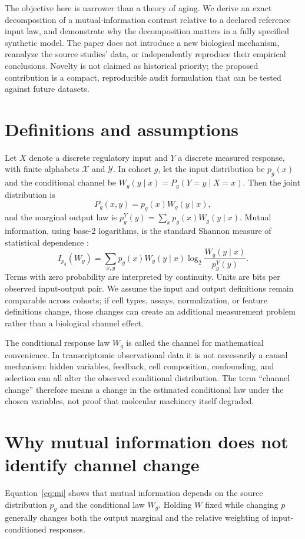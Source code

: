 \documentclass[11pt]{article}
\begin{document}
The objective here is narrower than a theory of aging. We derive an exact decomposition of a mutual-information contrast relative to a declared reference input law, and demonstrate why the decomposition matters in a fully specified synthetic model. The paper does not introduce a new biological mechanism, reanalyze the source studies' data, or independently reproduce their empirical conclusions. Novelty is not claimed as historical priority; the proposed contribution is a compact, reproducible audit formulation that can be tested against future datasets.

\section{Definitions and assumptions}
Let $X$ denote a discrete regulatory input and $Y$ a discrete measured response, with finite alphabets $\mathcal X$ and $\mathcal Y$. In cohort $g$, let the input distribution be $p_g(x)$ and the conditional channel be $W_g(y\mid x)=P_g(Y=y\mid X=x)$. Then the joint distribution is
\begin{equation}
P_g(x,y)=p_g(x)W_g(y\mid x),
\label{eq:joint}
\end{equation}
and the marginal output law is $p_g^Y(y)=\sum_x p_g(x)W_g(y\mid x)$. Mutual information, using base-2 logarithms, is the standard Shannon measure of statistical dependence \cite{cover2006}:
\begin{equation}
I_{p_g}(W_g)=\sum_{x,y}p_g(x)W_g(y\mid x)\log_2\frac{W_g(y\mid x)}{p_g^Y(y)}.
\label{eq:mi}
\end{equation}
Terms with zero probability are interpreted by continuity. Units are bits per observed input-output pair. We assume the input and output definitions remain comparable across cohorts; if cell types, assays, normalization, or feature definitions change, those changes can create an additional measurement problem rather than a biological channel effect.

The conditional response law $W_g$ is called the channel for mathematical convenience. In transcriptomic observational data it is not necessarily a causal mechanism: hidden variables, feedback, cell composition, confounding, and selection can all alter the observed conditional distribution. The term “channel change” therefore means a change in the estimated conditional law under the chosen variables, not proof that molecular machinery itself degraded.

\section{Why mutual information does not identify channel change}
Equation~\eqref{eq:mi} shows that mutual information depends on the source distribution $p_g$ and the conditional law $W_g$. Holding $W$ fixed while changing $p$ generally changes both the output marginal and the relative weighting of input-conditioned responses.
\end{document}
